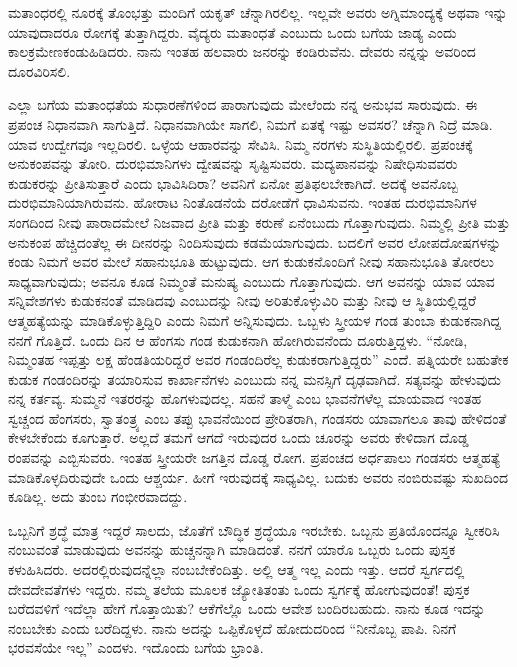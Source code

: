 ಮತಾಂಧರಲ್ಲಿ ನೂರಕ್ಕೆ ತೊಂಭತ್ತು ಮಂದಿಗೆ ಯಕೃತ್​ ಚೆನ್ನಾಗಿರಲಿಲ್ಲ. ಇಲ್ಲವೇ ಅವರು ಅಗ್ನಿಮಾಂದ್ಯಕ್ಕೆ ಅಥವಾ ಇನ್ನು ಯಾವುದಾದರೂ ರೋಗಕ್ಕೆ ತುತ್ತಾಗಿದ್ದರು. ವೈದ್ಯರು ಮತಾಂಧತೆ ಎಂಬುದು ಒಂದು ಬಗೆಯ ಜಾಡ್ಯ ಎಂದು ಕಾಲಕ್ರಮೇಣ\break ಕಂಡುಹಿಡಿದರು. ನಾನು ಇಂತಹ ಹಲವಾರು ಜನರನ್ನು ಕಂಡಿರುವೆನು. ದೇವರು ನನ್ನನ್ನು ಅವರಿಂದ ದೂರವಿರಿಸಲಿ.

ಎಲ್ಲಾ ಬಗೆಯ ಮತಾಂಧತೆಯ ಸುಧಾರಣೆಗಳಿಂದ ಪಾರಾಗುವುದು ಮೇಲೆಂದು ನನ್ನ ಅನುಭವ ಸಾರುವುದು. ಈ ಪ್ರಪಂಚ ನಿಧಾನವಾಗಿ ಸಾಗುತ್ತಿದೆ. ನಿಧಾನವಾಗಿಯೇ ಸಾಗಲಿ, ನಿಮಗೆ ಏತಕ್ಕೆ ಇಷ್ಟು ಅವಸರ? ಚೆನ್ನಾಗಿ ನಿದ್ರೆ ಮಾಡಿ. ಯಾವ ಉದ್ವೇಗವೂ ಇಲ್ಲದಿರಲಿ. ಒಳ್ಳೆಯ ಆಹಾರವನ್ನು ಸೇವಿಸಿ. ನಿಮ್ಮ ನರಗಳು ಸುಸ್ಥಿತಿಯಲ್ಲಿರಲಿ. ಪ್ರಪಂಚಕ್ಕೆ ಅನುಕಂಪವನ್ನು ತೋರಿ. ದುರಭಿಮಾನಿಗಳು ದ್ವೇಷವನ್ನು ಸೃಷ್ಟಿಸುವರು. ಮದ್ಯಪಾನವನ್ನು ನಿಷೇಧಿಸುವವರು ಕುಡುಕರನ್ನು ಪ್ರೀತಿಸುತ್ತಾರೆ ಎಂದು ಭಾವಿಸಿದಿರಾ? ಅವನಿಗೆ ಏನೋ ಪ್ರತಿಫಲಬೇಕಾಗಿದೆ. ಅದಕ್ಕೆ ಅವನೊಬ್ಬ ದುರಭಿಮಾನಿಯಾಗಿರುವನು. ಹೋರಾಟ ನಿಂತೊಡನೆಯೆ ದರೋಡೆಗೆ ಧಾವಿಸುವನು. ಇಂತಹ ದುರಭಿಮಾನಿಗಳ ಸಂಗದಿಂದ ನೀವು ಪಾರಾದಮೇಲೆ ನಿಜವಾದ ಪ್ರೀತಿ ಮತ್ತು ಕರುಣೆ ಏನೆಂಬುದು ಗೊತ್ತಾಗುವುದು. ನಿಮ್ಮಲ್ಲಿ ಪ್ರೀತಿ ಮತ್ತು ಅನುಕಂಪ ಹೆಚ್ಚಿದಂತೆಲ್ಲ ಈ ದೀನರನ್ನು ನಿಂದಿಸುವುದು ಕಡಮೆಯಾಗುವುದು. ಬದಲಿಗೆ ಅವರ ಲೋಪದೋಷಗಳನ್ನು ಕಂಡು ನಿಮಗೆ ಅವರ ಮೇಲೆ ಸಹಾನುಭೂತಿ ಹುಟ್ಟುವುದು. ಆಗ ಕುಡುಕನೊಂದಿಗೆ ನೀವು ಸಹಾನುಭೂತಿ ತೋರಲು ಸಾಧ್ಯವಾಗುವುದು; ಅವನೂ ಕೂಡ ನಿಮ್ಮಂತೆ ಮನುಷ್ಯ ಎಂಬುದು ಗೊತ್ತಾಗುವುದು. ಆಗ ಅವನನ್ನು ಯಾವ ಯಾವ ಸನ್ನಿವೇಶಗಳು ಕುಡುಕನಂತೆ ಮಾಡಿದವು ಎಂಬುದನ್ನು ನೀವು ಅರಿತುಕೊಳ್ಳುವಿರಿ ಮತ್ತು ನೀವು ಆ ಸ್ಥಿತಿಯಲ್ಲಿದ್ದರೆ ಆತ್ಮಹತ್ಯೆಯನ್ನು ಮಾಡಿಕೊಳ್ಳುತ್ತಿದ್ದಿರಿ ಎಂದು ನಿಮಗೆ ಅನ್ನಿಸುವುದು. ಒಬ್ಬಳು ಸ್ತ್ರೀಯಳ ಗಂಡ ತುಂಬಾ ಕುಡುಕನಾಗಿದ್ದ ನನಗೆ ಗೊತ್ತಿದೆ. ಒಂದು ದಿನ ಆ ಹೆಂಗಸು ಗಂಡ ಕುಡುಕನಾಗಿ ಹೋಗಿರುವನೆಂದು ದೂರುತ್ತಿದ್ದಳು. “ನೋಡಿ, ನಿಮ್ಮಂತಹ ಇಪ್ಪತ್ತು ಲಕ್ಷ ಹೆಂಡತಿಯರಿದ್ದರೆ ಅವರ ಗಂಡಂದಿರೆಲ್ಲ ಕುಡುಕರಾಗುತ್ತಿದ್ದರು” ಎಂದೆ. ಪತ್ನಿಯರೇ ಬಹುತೇಕ ಕುಡುಕ ಗಂಡಂದಿರನ್ನು ತಯಾರಿಸುವ ಕಾರ್ಖಾನೆಗಳು ಎಂಬುದು ನನ್ನ ಮನಸ್ಸಿಗೆ ದೃಢವಾಗಿದೆ. ಸತ್ಯವನ್ನು ಹೇಳುವುದು ನನ್ನ ಕರ್ತವ್ಯ. ಸುಮ್ಮನೆ ಇತರರನ್ನು ಹೊಗಳುವುದಲ್ಲ. ಸಹನೆ ತಾಳ್ಮೆ ಎಂಬ ಭಾವನೆಗಳೆಲ್ಲ ಮಾಯವಾದ ಇಂತಹ ಸ್ವಚ್ಚಂದ ಹೆಂಗಸರು, ಸ್ವಾತಂತ್ರ್ಯ ಎಂಬ ತಪ್ಪು ಭಾವನೆಯಿಂದ ಪ್ರೇರಿತರಾಗಿ, ಗಂಡಸರು ಯಾವಾಗಲೂ ತಾವು ಹೇಳಿದಂತೆ ಕೇಳಬೇಕೆಂದು ಕೂಗುತ್ತಾರೆ. ಅಲ್ಲದೆ ತಮಗೆ ಆಗದೆ ಇರುವುದರ ಒಂದು ಚೂರನ್ನು ಅವರು ಕೇಳಿದಾಗ ದೊಡ್ಡ ರಂಪವನ್ನು ಎಬ್ಬಿಸುವರು. ಇಂತಹ ಸ್ತ್ರೀಯರೇ ಜಗತ್ತಿನ ದೊಡ್ಡ ರೋಗ. ಪ್ರಪಂಚದ ಅರ್ಧಪಾಲು ಗಂಡಸರು ಆತ್ಮಹತ್ಯೆ ಮಾಡಿಕೊಳ್ಳದಿರುವುದೇ ಒಂದು ಆಶ್ಚರ್ಯ. ಹೀಗೆ ಇರುವುದಕ್ಕೆ ಸಾಧ್ಯವಿಲ್ಲ. ಬದುಕು ಅವರು ನಂಬಿರುವಷ್ಟು ಸುಖದಿಂದ ಕೂಡಿಲ್ಲ. ಅದು ತುಂಬ ಗಂಭೀರವಾದದ್ದು.

ಒಬ್ಬನಿಗೆ ಶ್ರದ್ಧೆ ಮಾತ್ರ ಇದ್ದರೆ ಸಾಲದು, ಜೊತೆಗೆ ಬೌದ್ಧಿಕ ಶ್ರದ್ಧೆಯೂ ಇರಬೇಕು. ಒಬ್ಬನು ಪ್ರತಿಯೊಂದನ್ನೂ ಸ್ವೀಕರಿಸಿ ನಂಬುವಂತೆ ಮಾಡುವುದು ಅವನನ್ನು ಹುಚ್ಚನನ್ನಾಗಿ ಮಾಡಿದಂತೆ. ನನಗೆ ಯಾರೊ ಒಬ್ಬರು ಒಂದು ಪುಸ್ತಕ ಕಳುಹಿಸಿದರು. ಅದರಲ್ಲಿರುವುದ\-ನ್ನೆಲ್ಲಾ ನಂಬಬೇಕೆಂದಿತ್ತು. ಅಲ್ಲಿ ಆತ್ಮ ಇಲ್ಲ ಎಂದು ಇತ್ತು. ಆದರೆ ಸ್ವರ್ಗದಲ್ಲಿ ದೇವದೇವತೆಗಳು ಇದ್ದರು. ನಮ್ಮ ತಲೆಯ ಮೂಲಕ ಜ್ಯೋತಿತಂತು ಒಂದು ಸ್ವರ್ಗಕ್ಕೆ ಹೋಗುವುದಂತೆ! ಪುಸ್ತಕ ಬರೆದವಳಿಗೆ ಇದೆಲ್ಲಾ ಹೇಗೆ ಗೊತ್ತಾಯಿತು? ಆಕೆಗೆಲ್ಲೊ ಒಂದು ಆವೇಶ ಬಂದಿರಬಹುದು. ನಾನು ಕೂಡ ಇದನ್ನು ನಂಬಬೇಕು ಎಂದು ಬರೆದಿದ್ದಳು. ನಾನು ಅದನ್ನು ಒಪ್ಪಿಕೊಳ್ಳದೆ ಹೋದುದರಿಂದ “ನೀನೊಬ್ಬ ಪಾಪಿ. ನಿನಗೆ ಭರವಸೆಯೇ ಇಲ್ಲ” ಎಂದಳು. ಇದೊಂದು ಬಗೆಯ ಭ್ರಾಂತಿ.

\vskip -0.5cm

